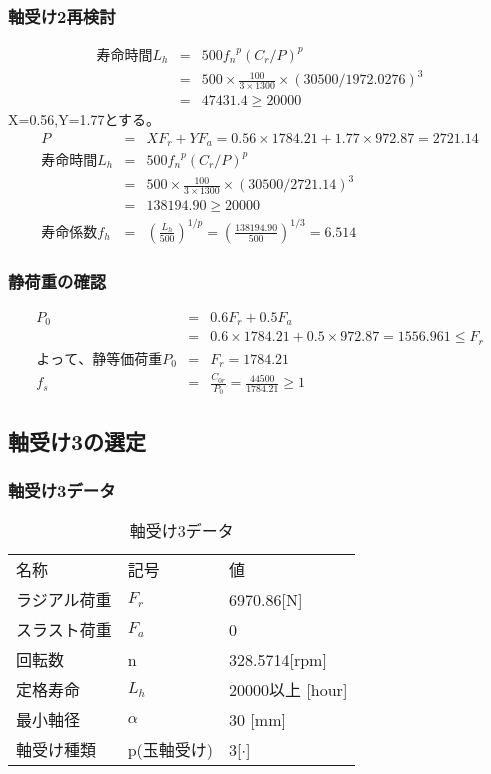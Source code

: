 \subsubsection{軸受け2再検討}
\begin{eqnarray}
寿命時間L_h &=& 500{f_n}^p(C_r/P)^p\\
           &=& 500 \times \frac{100}{3 \times 1300} \times (30500/1972.0276)^3\\
           &=& 47431.4 \geq 20000
\end{eqnarray}
X=0.56,Y=1.77とする。
\begin{eqnarray}
P &=& XF_r+YF_a = 0.56 \times 1784.21 + 1.77 \times 972.87 = 2721.14\\
寿命時間L_h &=& 500{f_n}^p(C_r/P)^p\\
           &=& 500 \times \frac{100}{3 \times 1300} \times (30500/2721.14)^3\\
           &=& 138194.90 \geq 20000\\
寿命係数f_h &=& \left( \frac{L_h}{500} \right)^{1/p} = \left( \frac{138194.90}{500} \right)^{1/3} = 6.514
\end{eqnarray}

\subsubsection{静荷重の確認}
\begin{eqnarray}
P_0&=&0.6F_r+0.5F_a\\
&=&0.6 \times 1784.21 + 0.5 \times 972.87 = 1556.961 \leq F_r\\
よって、静等価荷重P_0 &=& F_r =1784.21\\
f_s &=& \frac{C_{0r}}{P_0} = \frac{44500}{1784.21}\geq 1
\end{eqnarray}











\newpage
\subsection{軸受け3の選定}

\subsubsection{軸受け3データ}
\begin{table}[htb]
\begin{center}
  \caption{軸受け3データ}
  \begin{tabular}{lll} \hline
名称&記号&値\\
ラジアル荷重&$F_r$&6970.86[N]\\
スラスト荷重&$F_a$&0\\
回転数&n&328.5714[rpm]\\
定格寿命&$L_h$&20000以上 [hour]\\
最小軸径&$\alpha$&30 [mm]\\
軸受け種類&p(玉軸受け)&3[$\cdot$]\\
\hline
  \end{tabular}
\end{center}
\end{table}

